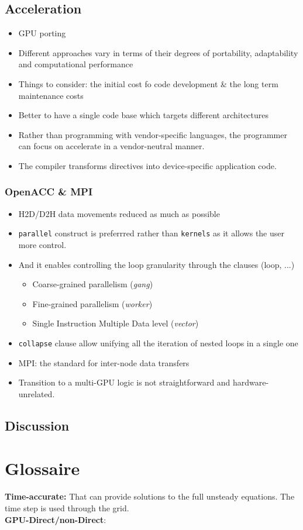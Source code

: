 \documentclass[10pt,a4paper]{article}
\newcommand{\code}[1]{\colorbox{light-gray}{\texttt{#1}}}
\begin{document}
\subsection{Acceleration}
\begin{itemize}
\item GPU porting
\item Different approaches vary in terms of their degrees of portability, adaptability and computational performance
\item Things to consider: the initial cost fo code development \& the long term maintenance costs
\item Better to have a single code base which targets different architectures
\item Rather than programming with vendor-specific languages, the programmer can focus on accelerate in a vendor-neutral manner.
\item The compiler transforms directives into device-specific application code.
\end{itemize}

\subsubsection{OpenACC \& MPI}
\begin{itemize}
\item H2D/D2H data movements reduced as much as possible
\item \code{parallel} construct is preferrred rather than \code{kernels} as it allows the user more control.
\item And it enables controlling the loop granularity through the clauses (loop, ...)
\begin{itemize}
\item Coarse-grained parallelism (\textit{gang})
\item Fine-grained parallelism (\textit{worker})
\item Single Instruction Multiple Data level (\textit{vector})
\end{itemize}
\item \code{collapse} clause allow unifying all the iteration of nested loops in a single one
\end{itemize}

\begin{itemize}
\item MPI: the standard for inter-node data transfers
\item Transition to a multi-GPU logic is not straightforward and hardware-unrelated.
\end{itemize}

\subsection{Discussion}

\section{Glossaire}
\textbf{Time-accurate:} That can provide solutions to the full unsteady equations. The time step is used through the grid.\\
\textbf{GPU-Direct/non-Direct}:
\end{document}
